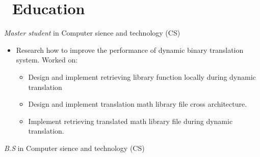 \documentclass{resume}
\begin{document}
\section{\faGraduationCap\  Education}\normalsize
{}
\textit{Master student} in Computer sience and technology (CS)
\begin{itemize}
\item Research how to improve the performance of dynamic binary translation system. Worked on:
  \begin{itemize}
  \item Design and implement retrieving library function locally during dynamic translation
  \item Design and implement translation math library file cross architecture.
  \item Implement retrieving translated math library file during dynamic translation.
  \end{itemize}

\end{itemize}
\textit{B.S} in Computer sience and technology (CS)


\end{document}
